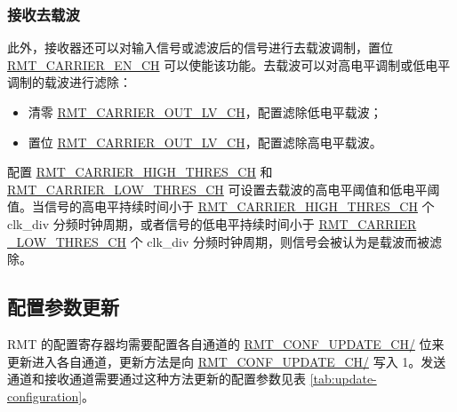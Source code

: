\documentclass[main\_\_CN.tex]{subfiles}
\begin{document}
\subsubsection{接收去载波}

此外，接收器还可以对输入信号或滤波后的信号进行去载波调制，置位 \hyperref[fielddesc:RMTCARRIERENCHM]{RMT\_CARRIER\_EN\_CH} 可以使能该功能。去载波可以对高电平调制或低电平调制的载波进行滤除：
\begin{itemize}
    \item 清零 \hyperref[fielddesc:RMTCARRIEROUTLVCHM]{RMT\_CARRIER\_OUT\_LV\_CH}，配置滤除低电平载波；
    \item 置位 \hyperref[fielddesc:RMTCARRIEROUTLVCHM]{RMT\_CARRIER\_OUT\_LV\_CH}，配置滤除高电平载波。
\end{itemize}

配置 \hyperref[fielddesc:RMTCARRIERHIGHTHRESCHM]{RMT\_CARRIER\_HIGH\_THRES\_CH} 和 \hyperref[fielddesc:RMTCARRIERLOWTHRESCHM]{RMT\_CARRIER\_LOW\_THRES\_CH} 可设置去载波的高电平阈值和低电平阈值。当信号的高电平持续时间小于 \hyperref[fielddesc:RMTCARRIERHIGHTHRESCHM]{RMT\_CARRIER\_HIGH\_THRES\_CH} 个 clk\_div 分频时钟周期，或者信号的低电平持续时间小于 \hyperref[fielddesc:RMTCARRIERLOWTHRESCHM]{RMT\_CARRIER \_LOW\_THRES\_CH} 个 clk\_div 分频时钟周期，则信号会被认为是载波而被滤除。

\subsection{配置参数更新}\label{conf_update}
RMT 的配置寄存器均需要配置各自通道的 \hyperref[fielddesc:RMTCONFUPDATECHN]{RMT\_CONF\_UPDATE\_CH/} 位来更新进入各自通道，更新方法是向 \hyperref[fielddesc:RMTCONFUPDATECHN]{RMT\_CONF\_UPDATE\_CH/} 写入 1。发送通道和接收通道需要通过这种方法更新的配置参数见表 \ref{tab:update-configuration}。
\end{document}
